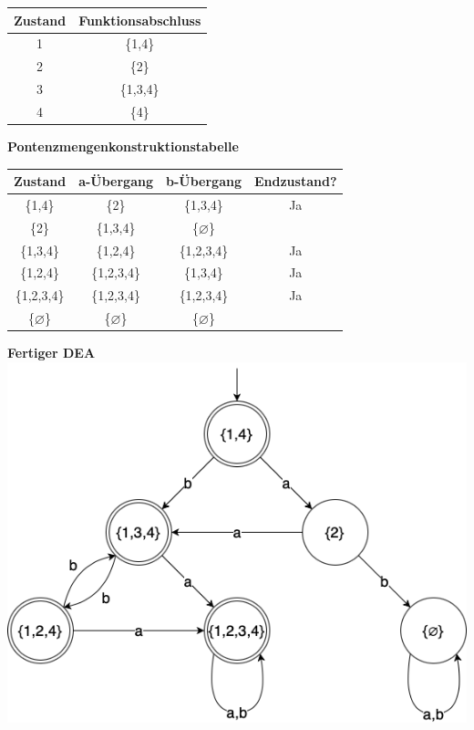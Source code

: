 \begin{teile}
	\begin{tabular}{|c|c|}
		\hline
		\textbf{Zustand}  & \textbf{Funktionsabschluss} \\
		\hline
		1                 & \{1,4\} \\
		\hline
		2                 & \{2\} \\
		\hline
		3                 & \{1,3,4\}  \\
		\hline
		4                 & \{4\} \\
		\hline
	\end{tabular}
	
	\textbf{Pontenzmengenkonstruktionstabelle}
	
	\begin{tabular}{|c|c|c|c|}
		\hline
		\textbf{Zustand} & \textbf{a-Übergang} & \textbf{b-Übergang} & \textbf{Endzustand?} \\
		\hline
		\{1,4\}     & \{2\}       & \{1,3,4\}         & Ja \\
		\hline
		\{2\}       & \{1,3,4\}   & \{$\varnothing$\} &    \\
		\hline
		\{1,3,4\}   & \{1,2,4\}   & \{1,2,3,4\}       & Ja \\
		\hline
		\{1,2,4\}   & \{1,2,3,4\} & \{1,3,4\}         & Ja \\
		\hline
		\{1,2,3,4\} & \{1,2,3,4\} & \{1,2,3,4\}       & Ja \\
		\hline
		\{$\varnothing$\}       & \{$\varnothing$\}   & \{$\varnothing$\} &    \\
		\hline
	\end{tabular}	
	
	\textbf{Fertiger DEA} \\
	
	\includegraphics[scale=0.5]{NEA-DEA}
	
\end{teile}


